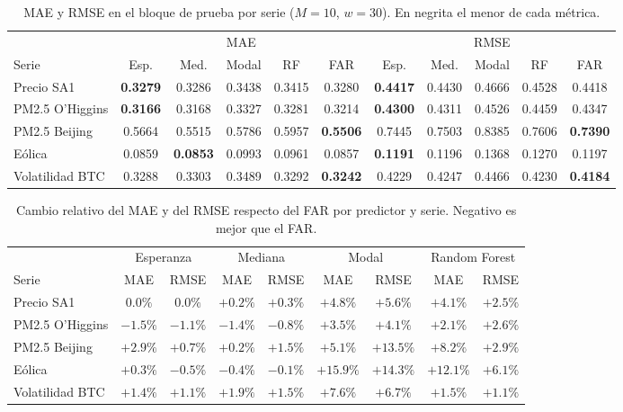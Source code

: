 \begin{table}[H]
\centering\footnotesize
\setlength{\tabcolsep}{2.5pt}
\caption{MAE y RMSE en el bloque de prueba por serie ($M = 10$, $w = 30$). En negrita el menor de cada métrica.}
\label{tab:aneD_bloqueA}
\begin{tabular}{l ccccc ccccc}
\hline
 & \multicolumn{5}{c}{MAE} & \multicolumn{5}{c}{RMSE} \\
Serie & Esp. & Med. & Modal & RF & FAR & Esp. & Med. & Modal & RF & FAR \\
\hline
Precio SA1 & \textbf{0.3279} & 0.3286 & 0.3438 & 0.3415 & 0.3280 & \textbf{0.4417} & 0.4430 & 0.4666 & 0.4528 & 0.4418 \\
PM2.5 O'Higgins & \textbf{0.3166} & 0.3168 & 0.3327 & 0.3281 & 0.3214 & \textbf{0.4300} & 0.4311 & 0.4526 & 0.4459 & 0.4347 \\
PM2.5 Beijing & 0.5664 & 0.5515 & 0.5786 & 0.5957 & \textbf{0.5506} & 0.7445 & 0.7503 & 0.8385 & 0.7606 & \textbf{0.7390} \\
Eólica & 0.0859 & \textbf{0.0853} & 0.0993 & 0.0961 & 0.0857 & \textbf{0.1191} & 0.1196 & 0.1368 & 0.1270 & 0.1197 \\
Volatilidad BTC & 0.3288 & 0.3303 & 0.3489 & 0.3292 & \textbf{0.3242} & 0.4229 & 0.4247 & 0.4466 & 0.4230 & \textbf{0.4184} \\
\hline
\end{tabular}
\end{table}

\begin{table}[H]
\centering\small
\setlength{\tabcolsep}{3.5pt}
\caption{Cambio relativo del MAE y del RMSE respecto del FAR por predictor y serie. Negativo es mejor que el FAR.}
\label{tab:aneD_bloqueA_ganancia}
\begin{tabular}{l cc cc cc cc}
\hline
 & \multicolumn{2}{c}{Esperanza} & \multicolumn{2}{c}{Mediana} & \multicolumn{2}{c}{Modal} & \multicolumn{2}{c}{Random Forest} \\
Serie & MAE & RMSE & MAE & RMSE & MAE & RMSE & MAE & RMSE \\
\hline
Precio SA1 & $0.0\%$ & $0.0\%$ & $+0.2\%$ & $+0.3\%$ & $+4.8\%$ & $+5.6\%$ & $+4.1\%$ & $+2.5\%$ \\
PM2.5 O'Higgins & $-1.5\%$ & $-1.1\%$ & $-1.4\%$ & $-0.8\%$ & $+3.5\%$ & $+4.1\%$ & $+2.1\%$ & $+2.6\%$ \\
PM2.5 Beijing & $+2.9\%$ & $+0.7\%$ & $+0.2\%$ & $+1.5\%$ & $+5.1\%$ & $+13.5\%$ & $+8.2\%$ & $+2.9\%$ \\
Eólica & $+0.3\%$ & $-0.5\%$ & $-0.4\%$ & $-0.1\%$ & $+15.9\%$ & $+14.3\%$ & $+12.1\%$ & $+6.1\%$ \\
Volatilidad BTC & $+1.4\%$ & $+1.1\%$ & $+1.9\%$ & $+1.5\%$ & $+7.6\%$ & $+6.7\%$ & $+1.5\%$ & $+1.1\%$ \\
\hline
\end{tabular}
\end{table}

